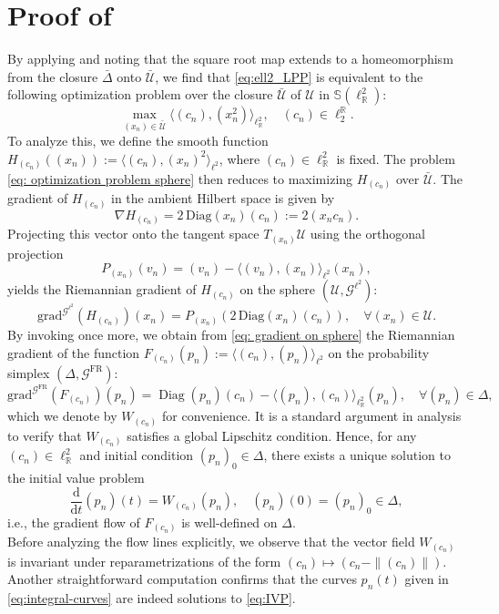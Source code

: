\documentclass[runningheads]{llncs}
\def\RR{\mathbb{R}}
\def\Slr{\mathbb{S}\left(\ell_{\RR}^2 \right)}
\def\U{\mathcal{U}}
\def\Glt{\mathcal{G}^{\ell^2}}
\def\Gfr{\mathcal{G}^{\mathrm{FR}}}
\def\d{\mathrm{d}}
\newcommand{\R}{\mathbb{R}}
\begin{document}
\section{Proof of }\label{Appendix proof Prop}
By applying  and noting that the square root map extends to a homeomorphism from the closure $\bar{\Delta}$ onto $\bar{\U}$, we find that \eqref{eq:ell2_LPP} is equivalent to the following optimization problem over the closure $\bar{\U}$ of $\U$ in $\Slr$:
\begin{equation}\tag{NLP}\label{eq: optimization problem sphere}
	\max_{(x_n) \in \bar{\U}} \langle (c_n), (x_n^2) \rangle_{\ell^2_\R}, \quad (c_n )\in \ell_2^\R.
\end{equation}
To analyze this, we define the smooth function \( H_{(c_n)}((x_n)) := \langle (c_n), (x_n)^2 \rangle_{\ell^2} \), where \( (c_n) \in \ell^2_{\mathbb{R}} \) is fixed. The problem \eqref{eq: optimization problem sphere} then reduces to maximizing \( H_{(c_n)} \) over \( \bar{\U} \). The gradient of \( H_{(c_n)} \) in the ambient Hilbert space is given by
\[
\nabla H_{(c_n)} = 2\,\mathrm{Diag}(x_n)(c_n) := 2(x_n c_n).
\]
Projecting this vector onto the tangent space \( T_{(x_n)}\U \) using the orthogonal projection
\[
P_{(x_n)}(v_n) = (v_n) - \langle (v_n), (x_n) \rangle_{\ell^2} (x_n),
\]
yields the Riemannian gradient of \( H_{(c_n)} \) on the sphere \( (\U, \Glt) \):
\begin{equation}\label{eq: gradient on sphere}
	\mathrm{grad}^{\Glt}(H_{(c_n)})(x_n) = P_{(x_n)}\left( 2\,\mathrm{Diag}(x_n)(c_n) \right), \quad \forall (x_n)\in\U.
\end{equation}
By invoking  once more, we obtain from \eqref{eq: gradient on sphere} the Riemannian gradient of the function \( F_{(c_n)}(p_n) := \langle (c_n), (p_n) \rangle_{\ell^2} \) on the probability simplex \( (\Delta, \Gfr) \):
\begin{equation} \label{def:W_c}
\mathrm{grad}^{\Gfr}(F_{(c_n)})(p_n) = \operatorname{Diag}(p_n)(c_n) - \langle (p_n), (c_n) \rangle_{\ell^2_\R} (p_n), \quad \forall (p_n) \in \Delta,
\end{equation}
which we denote by \( W_{(c_n)} \) for convenience. It is a standard argument in analysis to verify that \( W_{(c_n)} \) satisfies a global Lipschitz condition. Hence, for any \( (c_n) \in \ell^2_\R \) and initial condition \( (p_n)_0 \in \Delta \), there exists a unique solution to the initial value problem
\begin{equation}\label{eq:IVP}
	\frac{\d}{\d t}(p_n)(t) = W_{(c_n)}(p_n), \quad (p_n)(0) = (p_n)_0 \in \Delta,
\end{equation}
i.e., the gradient flow of \( F_{(c_n)} \) is well-defined on \( \Delta \).\\
Before analyzing the flow lines explicitly, we observe that the vector field \( W_{(c_n)} \) is invariant under reparametrizations of the form \( (c_n) \mapsto (c_n - \| (c_n) \|) \). Another straightforward computation confirms that the curves \( p_n(t) \) given in \eqref{eq:integral-curves} are indeed solutions to \eqref{eq:IVP}.
\end{document}
